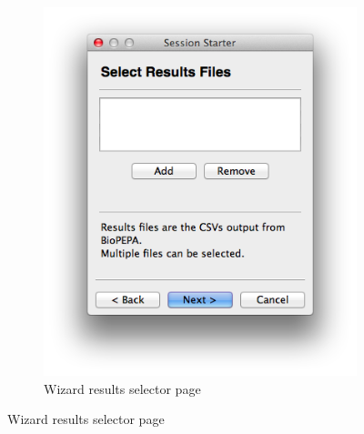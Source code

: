 \begin{figure}[h!]
\begin{subfigure}[b]{0.24\textwidth}
        \includegraphics[width=\textwidth]{images/wizard_page_2.png}
        \caption{Wizard results selector page}
        \label{fig:page_2}
    \end{subfigure}


\end{figure}
